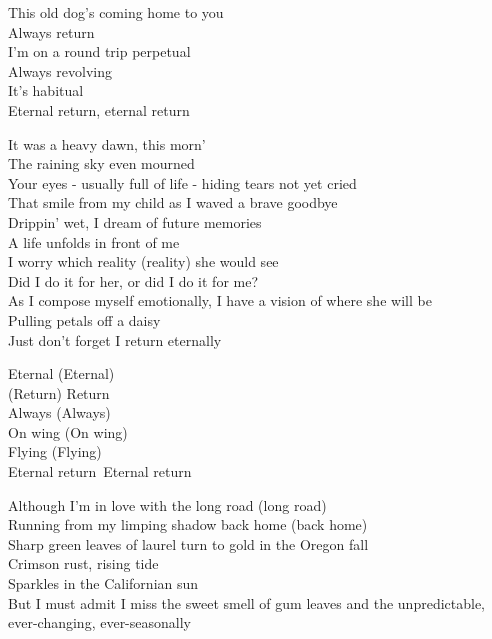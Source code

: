 


This old dog's coming home to you\\
Always return\\
I'm on a round trip perpetual\\
Always revolving\\
It's habitual\\
Eternal return, eternal return\\


It was a heavy dawn, this morn'\\
The raining sky even mourned\\
Your eyes - usually full of life - hiding tears not yet cried\\
That smile from my child as I waved a brave goodbye\\
Drippin' wet, I dream of future memories\\
A life unfolds in front of me\\

I worry which reality (reality) she would see\\
Did I do it for her, or did I do it for me?\\
As I compose myself emotionally, I have a vision of where she will be\\
Pulling petals off a daisy\\
Just don't forget I return eternally\\


Eternal (Eternal)\\
(Return) Return\\
Always (Always)\\
On wing (On wing)\\
Flying (Flying)\\
Eternal return\
Eternal return\\


Although I'm in love with the long road (long road)\\
Running from my limping shadow back home (back home)\\
Sharp green leaves of laurel turn to gold in the Oregon fall\\
Crimson rust, rising tide\\
Sparkles in the Californian sun\\
But I must admit I miss the sweet smell of gum leaves and the unpredictable, ever-changing, ever-seasonally\\

